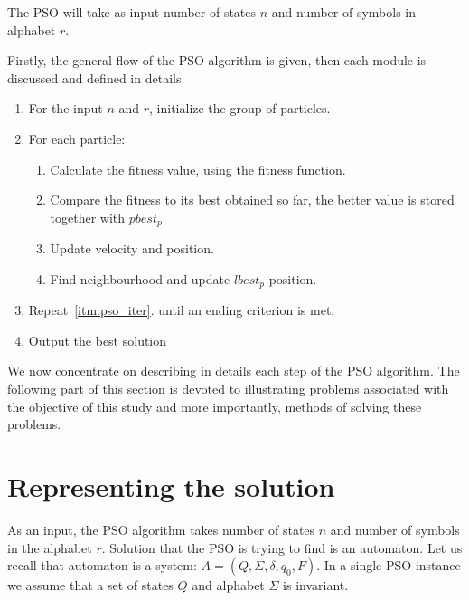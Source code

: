 \documentclass{mini}
\begin{document}
The PSO will take as input number of states $n$ and number of symbols in alphabet $r$.

Firstly, the general flow of the PSO algorithm is given, then each module is discussed and defined in details.

\begin{center}
    
    \begin{enumerate}
        \item For the input $n$ and $r$, initialize the group of particles.
        
        \item For each particle: \label{itm:pso_iter}
        \begin{enumerate}
            \item Calculate the fitness value, using the fitness function.
            \item Compare the fitness to its best obtained so far, the better value is stored together with $pbest_p$	
            
            \item Update velocity and position.	
            
            \item Find neighbourhood and update $lbest_p$ position.
        \end{enumerate}		
        
        
        
        \item Repeat~\ref{itm:pso_iter}. until an ending criterion is met.
        
        \item Output the best solution	
        
    \end{enumerate}
    
\end{center}

We now concentrate on describing in details each step of the PSO algorithm. The following part of this section is devoted to illustrating problems associated with the objective of this study and more importantly, methods of solving these problems.


\section{Representing the solution}
As an input, the PSO algorithm takes number of states $n$ and number of symbols in the alphabet $r$.
Solution that the PSO is trying to find is an automaton. Let us recall that automaton is a system: $A = (Q, \Sigma, \delta, q_0, F)$. In a single PSO instance we assume that a set of states $Q$ and alphabet $\Sigma$ is invariant. 
\end{document}
